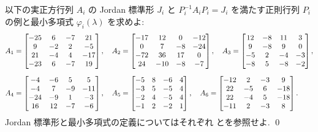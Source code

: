 \documentclass[12pt,twoside]{jarticle}
\begin{document}
\begin{question}
\label{q:Jordan-normal-form-example}
  以下の実正方行列 $A_i$ の Jordan 標準形 $J_i$ と $P_i^{-1}A_iP_i=J_i$ 
  を満たす正則行列 $P_i$ の例と最小多項式 $\varphi_i(\lambda)$ を求めよ:
  {\small
  \begin{align*}
    &
    A_1 =
    \begin{bmatrix}
      -25 &   6 &  -7 &  21 \\
        9 &  -2 &   2 &  -5 \\
       21 &  -4 &   4 & -17 \\
      -23 &   6 &  -7 &  19 \\
    \end{bmatrix},
    \quad
    A_2 =
    \begin{bmatrix}
      -17 &  12 &   0 & -12 \\
        0 &   7 &  -8 & -24 \\
      -72 &  36 &  17 &   0 \\
       24 & -10 &  -8 &  -7 \\
    \end{bmatrix},
    \quad
    A_3 =
    \begin{bmatrix}
      12 &  -8 &  11 &   3 \\
       9 &  -8 &   9 &   0 \\
      -5 &   2 &  -4 &  -3 \\
      -8 &   5 &  -8 &  -2 \\
    \end{bmatrix},
    \\[\medskipamount] &
    A_4 =
    \begin{bmatrix}
       -4 &  -6 &   5 &   5 \\
       -4 &   7 &  -9 & -11 \\
      -24 &  -9 &   1 &  -3 \\
       16 &  12 &  -7 &  -6 \\
    \end{bmatrix},
    \quad
    A_5 =
    \begin{bmatrix}
      -5 &  8 & -6 &  4 \\
      -3 &  5 & -5 &  4 \\
      -2 &  4 & -5 &  4 \\
      -1 &  2 & -2 &  1 \\
    \end{bmatrix},
    \quad
    A_6 =
    \begin{bmatrix}
      -12 &   2 &  -3 &   9 \\
       22 &  -5 &   6 & -18 \\
       22 &  -4 &   5 & -18 \\
      -11 &   2 &  -3 &   8 \\
    \end{bmatrix}.
  \end{align*}
  }Jordan 標準形と最小多項式の定義についてはそれぞれ
  とを参照せよ. 
  \qed
\end{question}
\end{document}
